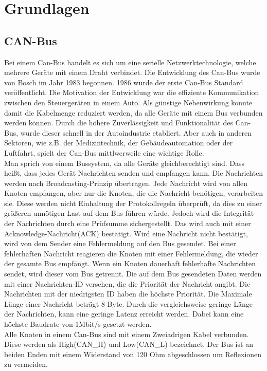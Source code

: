 \chapter{Grundlagen}


\section{CAN-Bus}
Bei einem Can-Bus handelt es sich um eine serielle Netzwerktechnologie, 
welche mehrere Geräte mit einem Draht verbindet.
Die Entwicklung des Can-Bus wurde von Bosch im Jahr 1983 begonnen. 1986 wurde der erste Can-Bus Standard 
veröffentlicht.
Die Motivation der Entwicklung war die effiziente Kommunikation zwischen den Steuergeräten in einem Auto. 
Als günstige
Nebenwirkung konnte damit die Kabelmenge reduziert werden, da alle Geräte mit einem Bus verbunden werden können.
Durch die höhere Zuverlässigkeit und Funktionalität des Can-Bus, wurde dieser schnell in der Autoindustrie etabliert.
Aber auch in anderen Sektoren, wie z.B. der Medizintechnik, der Gebäudeautomation oder der Luftfahrt, spielt der
Can-Bus mittlwerweile eine wichtige Rolle.
\cite[Seiten 2-10]{Voss2008}
\\
Man sprich von einem Bussystem, da alle Geräte gleichberechtigt sind. Dass heißt, dass jedes Gerät Nachrichten 
senden und empfangen kann.
Die Nachrichten werden nach Broadcasting-Prinzip übertragen. Jede Nachricht wird von allen Knoten empfangen, 
aber nur die Knoten, die die Nachricht benötigen, verarbeiten sie. Diese werden nicht Einhaltung der Protokollregeln 
überprüft,
da dies zu einer größeren unnötigen Last auf dem Bus führen würde. 
Jedoch wird die Integrität der Nachrichten durch eine Prüfsumme sichergestellt. Das wird auch mit 
einer Acknowledge-Nachricht(ACK) bestätigt. Wird eine Nachricht nicht bestätigt, wird von dem Sender eine Fehlermeldung
auf den Bus gesendet.
Bei einer fehlerhaften Nachricht reagieren
die Knoten mit einer Fehlermeldung, die wieder der gesamte Bus empfängt. Wenn ein Knoten dauerhaft fehlerhafte
Nachrichten sendet, wird dieser vom Bus getrennt. Die auf dem Bus gesendeten Daten werden mit einer Nachrichten-ID
versehen, die die Priorität der Nachricht angibt. Die Nachrichten mit der niedrigsten ID haben die höchste Priorität.
Die Maximale Länge einer Nachricht beträgt 8 Byte. Durch die vergleichsweise geringe Länge der Nachrichten, kann 
eine geringe Latenz erreicht werden. Dabei kann eine höchste Baudrate von 1Mbit/s gesetzt werden.
\cite[Seiten 13-19]{Voss2008}
\\
Alle Knoten in einem Can-Bus sind mit einem Zweiadrigen Kabel verbunden. Diese werden als High(CAN\_H) und Low(CAN\_L) 
bezeichnet. Der Bus ist an beiden Enden mit einem Widerstand von 120 Ohm abgeschlossen um Reflexionen zu vermeiden.
\cite[Seite 132]{Voss2008}
\\


